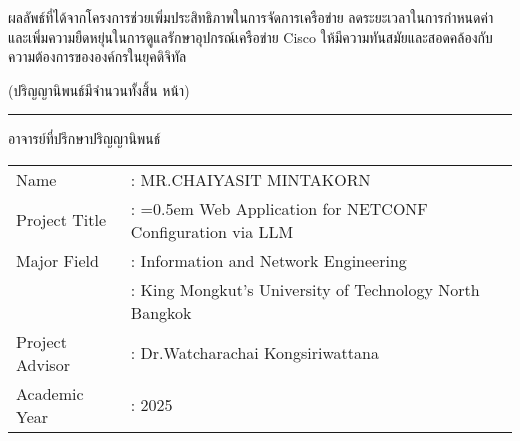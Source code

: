 \hspace*{1.5em} %
ผลลัพธ์ที่ได้จากโครงการช่วยเพิ่มประสิทธิภาพในการจัดการเครือข่าย ลดระยะเวลาในการกำหนดค่า และเพิ่มความยืดหยุ่นในการดูแลรักษาอุปกรณ์เครือข่าย Cisco ให้มีความทันสมัยและสอดคล้องกับความต้องการขององค์กรในยุคดิจิทัล
\begin{flushright}
(ปริญญานิพนธ์มีจำนวนทั้งสิ้น \pageref{LastPage} หน้า)

\vfill
\rule{10 cm}{0.4pt} อาจารย์ที่ปรึกษาปริญญานิพนธ์ 

\end{flushright}





\newpage
{}
{}
\begin{tabularx}{\textwidth}{lX}
Name                    & : MR.CHAIYASIT MINTAKORN  %
\\
Project Title           & : \hangindent=0.5em %
                            Web Application for NETCONF Configuration via LLM  %
\\
Major Field             & : Information and Network Engineering %
\\
                        & : King Mongkut’s University of Technology North Bangkok
\\
Project Advisor         & : Dr.Watcharachai Kongsiriwattana  %
\\
Academic Year           & : 2025    %
\end{tabularx}

